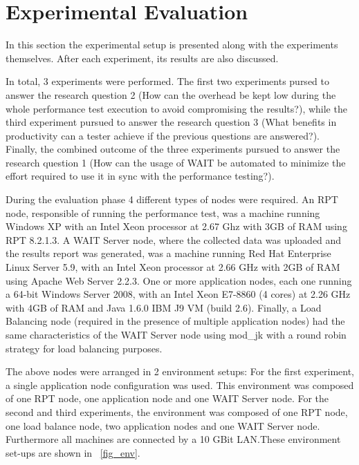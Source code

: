 \documentclass[runningheads,a4paper]{llncs}
\begin{document}

\section{Experimental Evaluation}

In this section the experimental setup is presented along with the experiments themselves. 
After each experiment, its results are also discussed.

In total, 3 experiments were performed. The first two experiments pursed to
answer the research question 2 (How can the overhead be kept low during the whole 
performance test execution to avoid compromising the results?), while the third experiment
pursued to answer the research question 3 (What benefits in productivity can a tester 
achieve if the previous questions are answered?). Finally, the combined outcome
of the three experiments pursued to answer the research question 1 (How can the usage 
of WAIT be automated to minimize the effort required to use it in sync with the performance testing?).

During the evaluation phase 4 different types of nodes were required. An RPT
node, responsible of running the performance test, was a machine running Windows
XP with an Intel Xeon processor at 2.67 Ghz with 3GB of RAM using RPT 8.2.1.3.
A WAIT Server node, where the collected data was uploaded and the results
report was generated, was a machine running Red Hat Enterprise Linux Server 5.9,
with an Intel Xeon processor at 2.66 GHz with 2GB of RAM using Apache Web Server 2.2.3.
One or more application nodes, each one running a 64-bit Windows Server 2008,
with an Intel Xeon E7-8860 (4 cores) at 2.26 GHz with 4GB of RAM and Java 1.6.0
IBM J9 VM (build 2.6). Finally, a Load Balancing node (required in the presence
of multiple application nodes) had the same characteristics of the WAIT Server node using
mod\_jk with a round robin strategy for load balancing purposes.

The above nodes were arranged in 2 environment setups: For the first
experiment, a single application node configuration was used. This environment was composed of one RPT node, 
one application node and one WAIT Server node. For the second and
third experiments, the environment was composed of one RPT node, one load
balance node, two application nodes and one WAIT Server node. Furthermore all
machines are connected by a 10 GBit LAN.These environment set-ups are shown in \figurename ~\ref{fig_env}.
\end{document}
